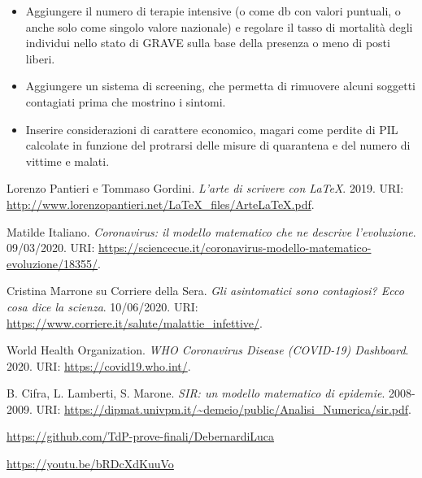 \documentclass[a4paper, 12pt]{article}
\begin{document}
\begin{itemize}
		\item Aggiungere il numero di terapie intensive (o come db con valori puntuali, o anche solo come singolo valore nazionale) e regolare il tasso di mortalità degli individui nello stato di GRAVE sulla base della presenza o meno di posti liberi.
		\item Aggiungere un sistema di screening, che permetta di rimuovere alcuni soggetti contagiati prima che mostrino i sintomi.
		\item Inserire considerazioni di carattere economico, magari come perdite di PIL calcolate in funzione del protrarsi delle misure di quarantena e del numero di vittime e malati.
	\end{itemize}


\newpage
	
	\begin{thebibliography}{9}
		 Lorenzo Pantieri e Tommaso Gordini. \emph{L'arte di scrivere con \LaTeX}. 2019. URI: \url{http://www.lorenzopantieri.net/LaTeX_files/ArteLaTeX.pdf}.
		
		 Matilde Italiano. \emph{Coronavirus: il modello matematico che ne descrive l’evoluzione}. 09/03/2020. URI: \url{https://sciencecue.it/coronavirus-modello-matematico-evoluzione/18355/}.
		
		 Cristina Marrone su Corriere della Sera. \emph{Gli asintomatici sono contagiosi? Ecco cosa dice la scienza}. 10/06/2020. URI: \url{https://www.corriere.it/salute/malattie_infettive/}.
		
		 World Health Organization. \emph{WHO Coronavirus Disease (COVID-19) Dashboard}. 2020. URI: \url{https://covid19.who.int/}.
		
		 B. Cifra, L. Lamberti, S. Marone. \emph{SIR: un modello matematico di epidemie}. 2008-2009. URI: \url{https://dipmat.univpm.it/~demeio/public/Analisi_Numerica/sir.pdf}.
	\end{thebibliography}
	
	\vfill
	
	\begin{description}
		\centering
		\item[Repository:] \hfill \url{https://github.com/TdP-prove-finali/DebernardiLuca}
		\item[Video informativo:] \hfill \url{https://youtu.be/bRDcXdKuuVo}
	\end{description}

\newpage
\end{document}
